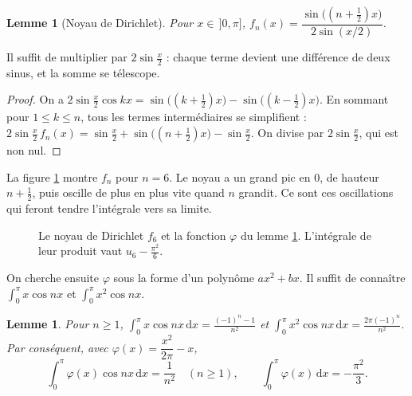 \documentclass[11pt,a4paper]{article}
\theoremstyle{plain}
\newtheorem{lemme}[theoreme]{Lemme}
\theoremstyle{definition}
\theoremstyle{remark}
\newcommand{\dd}{\,\mathrm{d}}
\begin{document}
\begin{lemme}[Noyau de Dirichlet]\label{lem:dirichlet}
Pour $x\in\,]0,\pi]$, $f_n(x)=\dfrac{\sin\big((n+\frac12)x\big)}{2\sin(x/2)}$.
\end{lemme}

Il suffit de multiplier par $2\sin\frac x2$ : chaque terme devient une différence de deux sinus, et la somme se télescope.

\begin{proof}
On a $2\sin\frac x2\cos kx=\sin\big((k+\frac12)x\big)-\sin\big((k-\frac12)x\big)$. En sommant pour $1\leq k\leq n$, tous les termes intermédiaires se simplifient : $2\sin\frac x2\,f_n(x)=\sin\frac x2+\sin\big((n+\frac12)x\big)-\sin\frac x2$. On divise par $2\sin\frac x2$, qui est non nul.
\end{proof}

La figure \ref{fig:dirichlet} montre $f_n$ pour $n=6$. Le noyau a un grand pic en $0$, de hauteur $n+\frac12$, puis oscille de plus en plus vite quand $n$ grandit. Ce sont ces oscillations qui feront tendre l'intégrale vers sa limite.

\begin{figure}[h]
\centering
{}
\caption{Le noyau de Dirichlet $f_6$ et la fonction $\varphi$ du lemme \ref{lem:coef}. L'intégrale de leur produit vaut $u_6-\frac{\pi^2}6$.}\label{fig:dirichlet}
\end{figure}

On cherche ensuite $\varphi$ sous la forme d'un polynôme $ax^2+bx$. Il suffit de connaître $\int_0^\pi x\cos nx$ et $\int_0^\pi x^2\cos nx$.

\begin{lemme}\label{lem:coef}
Pour $n\geq1$, $\displaystyle\int_0^\pi x\cos nx\dd x=\frac{(-1)^n-1}{n^2}$ et $\displaystyle\int_0^\pi x^2\cos nx\dd x=\frac{2\pi(-1)^n}{n^2}$. Par conséquent, avec $\varphi(x)=\dfrac{x^2}{2\pi}-x$,
\[
  \int_0^\pi\varphi(x)\cos nx\dd x=\frac1{n^2}\quad(n\geq1),\qquad\int_0^\pi\varphi(x)\dd x=-\frac{\pi^2}3 .
\]
\end{lemme}
\end{document}
